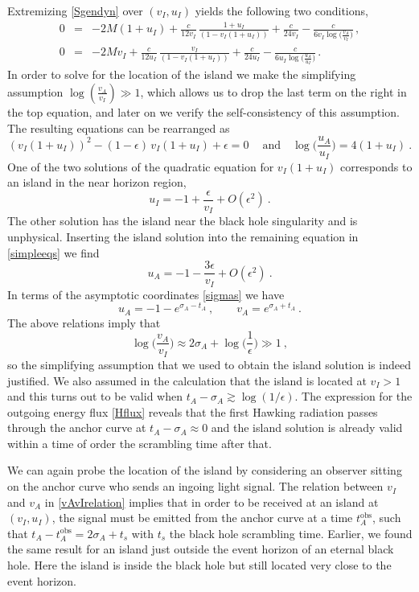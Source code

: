 \documentclass[12pt,a4paper]{article}
\newcommand{\be}{\begin{equation}}
\newcommand{\ee}{\end{equation}}
\newcommand{\f}[2]{\frac{#1}{#2}}
\begin{document}
Extremizing \eqref{Sgendyn} over $(v_I,u_I)$ yields the following two conditions,
\begin{eqnarray}
0&=& -2M(1+u_I)+\f{c}{12v_I}\,\f{1+u_I}{(1-v_I(1+u_I))} + \f{c}{24v_I} - \f{c}{6v_I\log\big(\f{v_A}{v_I}\big)}\,, \\
0&=& -2Mv_I+\f{c}{12u_I}\,\f{v_I}{(1-v_I(1+u_I))} + \f{c}{24u_I} - \f{c}{6u_I\log\big(\f{u_A}{u_I}\big)}\,.
\end{eqnarray}
In order to solve for the location of the island we make the simplifying assumption $\log(\f{v_A}{v_I})\gg 1$, which allows us to drop the last term on the right in the top equation, and later on we verify the self-consistency of this assumption. The resulting equations can be rearranged as 
\be\label{simpleeqs}
(v_I(1+u_I))^2-(1-\epsilon)\,v_I(1+u_I)+\epsilon=0 \>\quad\text{and}\quad \log\big(\f{u_A}{u_I}\big)=4(1+u_I) \>.
\ee
One of the two solutions of the quadratic equation for $v_I(1+u_I)$ corresponds to an island in the near horizon region,
\be
u_I=-1+\frac{\epsilon}{v_I}+O(\epsilon^2)\>.
\ee
The other solution has the island near the black hole singularity and is unphysical. 
Inserting the island solution into the remaining equation in \eqref{simpleeqs} we find
\be
u_A=-1-\f{3\epsilon}{v_I}+O(\epsilon^2)\>.
\ee
In terms of the asymptotic coordinates \eqref{sigmas} we have
\be 
u_A= -1 -e^{\sigma_A-t_A}\>, \qquad v_A= e^{\sigma_A+t_A} \>.
\ee
The above relations imply that
\be\label{vAvIrelation}
\log\big(\f{v_A}{v_I}\big)\approx 2\sigma_A+\log\big(\f{1}{\epsilon}\big)\gg 1 \>,
\ee
so the simplifying assumption that we used to obtain the island solution is indeed justified.
We also assumed in the calculation that the island is located at $v_I>1$ and 
this turns out to be valid when $t_A-\sigma_A\gtrsim \log(1/\epsilon)$. 
The expression for the outgoing energy flux \eqref{Hflux} reveals that the first Hawking radiation passes through the anchor curve at $t_A-\sigma_A\approx 0$ and the island solution is already valid within a time of order the scrambling time after that. 

We can again probe the location of the island by considering an observer sitting on the anchor curve who sends an ingoing light signal. The relation between $v_I$ and $v_A$ in \eqref{vAvIrelation} implies that in order to be received at an island at $(v_I,u_I)$, the signal must be emitted from the anchor curve at a time $t_A^\text{obs}$, such that $t_A -t_A^\text{obs}=2\sigma_A + t_s$ with $t_s$ the black hole scrambling time. Earlier, we found the same result for an island just outside the event horizon of an eternal black hole. Here the island is inside the black hole but still located very close to the event horizon. 
\end{document}
